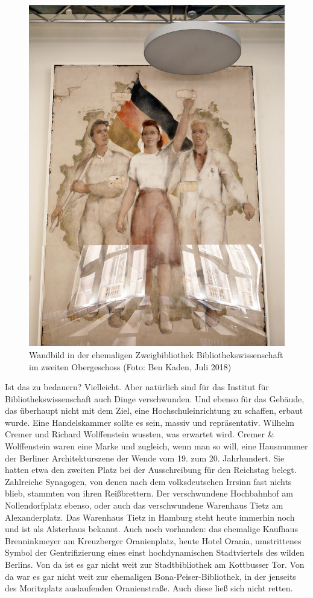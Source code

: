 \documentclass[a4paper,
fontsize=11pt,
oneside,
numbers=noperiodatend,
parskip=half-,
bibliography=totoc,
final
]{scrartcl}
\begin{document}
\begin{figure}
\centering
\includegraphics{img/wandbild-ibi.jpg}
\caption{Wandbild in der ehemaligen Zweigbibliothek Bibliothekswissenschaft im zweiten Obergeschoss (Foto: Ben Kaden, Juli 2018)}
\end{figure}

Ist das zu bedauern? Vielleicht. Aber natürlich sind für das Institut
für Bibliothekswissenschaft auch Dinge verschwunden. Und ebenso für das
Gebäude, das überhaupt nicht mit dem Ziel, eine Hochschuleinrichtung zu
schaffen, erbaut wurde. Eine Handelskammer sollte es sein, massiv und
repräsentativ. Wilhelm Cremer und Richard Wolffenstein wussten, was
erwartet wird. Cremer \& Wolffenstein waren eine Marke und zugleich,
wenn man so will, eine Hausnummer der Berliner Architekturszene der
Wende vom 19. zum 20. Jahrhundert. Sie hatten etwa den zweiten Platz bei
der Ausschreibung für den Reichstag belegt. Zahlreiche Synagogen, von
denen nach dem volksdeutschen Irrsinn fast nichts blieb, stammten von
ihren Reißbrettern. Der verschwundene Hochbahnhof am Nollendorfplatz
ebenso, oder auch das verschwundene Warenhaus Tietz am Alexanderplatz.
Das Warenhaus Tietz in Hamburg steht heute immerhin noch und ist als
Alsterhaus bekannt. Auch noch vorhanden: das ehemalige Kaufhaus
Brenninkmeyer am Kreuzberger Oranienplatz, heute Hotel Orania,
umstrittenes Symbol der Gentrifizierung eines einst hochdynamischen
Stadtviertels des wilden Berlins. Von da ist es gar nicht weit zur
Stadtbibliothek am Kottbusser Tor. Von da war es gar nicht weit zur
ehemaligen Bona-Peiser-Bibliothek, in der jenseits des Moritzplatz
auslaufenden Oranienstraße. Auch diese ließ sich nicht retten.
\end{document}
